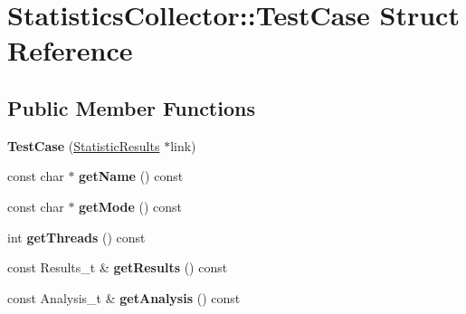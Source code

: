 \hypertarget{structStatisticsCollector_1_1TestCase}{}\section{Statistics\+Collector\+:\+:Test\+Case Struct Reference}
\label{structStatisticsCollector_1_1TestCase}
\subsection*{Public Member Functions}
\begin{DoxyCompactItemize}
\item 
\hypertarget{structStatisticsCollector_1_1TestCase_ac566bc649a14987f5947a120634773ea}{}{\bfseries Test\+Case} (\hyperlink{structStatisticsCollector_1_1StatisticResults}{Statistic\+Results} $\ast$link)\label{structStatisticsCollector_1_1TestCase_ac566bc649a14987f5947a120634773ea}

\item 
\hypertarget{structStatisticsCollector_1_1TestCase_ac364f2f161cb237be184c2819796fbd6}{}const char $\ast$ {\bfseries get\+Name} () const \label{structStatisticsCollector_1_1TestCase_ac364f2f161cb237be184c2819796fbd6}

\item 
\hypertarget{structStatisticsCollector_1_1TestCase_a4dd3eb453874c19c92588b19bb0de0bf}{}const char $\ast$ {\bfseries get\+Mode} () const \label{structStatisticsCollector_1_1TestCase_a4dd3eb453874c19c92588b19bb0de0bf}

\item 
\hypertarget{structStatisticsCollector_1_1TestCase_ab60c62315d04cd4b6a6e3647b7426c17}{}int {\bfseries get\+Threads} () const \label{structStatisticsCollector_1_1TestCase_ab60c62315d04cd4b6a6e3647b7426c17}

\item 
\hypertarget{structStatisticsCollector_1_1TestCase_a5569b06cf4b5d2d69db79b0264c16e93}{}const Results\+\_\+t \& {\bfseries get\+Results} () const \label{structStatisticsCollector_1_1TestCase_a5569b06cf4b5d2d69db79b0264c16e93}

\item 
\hypertarget{structStatisticsCollector_1_1TestCase_afac8add3b087ab2c805a8c1f7a4ccca0}{}const Analysis\+\_\+t \& {\bfseries get\+Analysis} () const \label{structStatisticsCollector_1_1TestCase_afac8add3b087ab2c805a8c1f7a4ccca0}

\end{DoxyCompactItemize}
